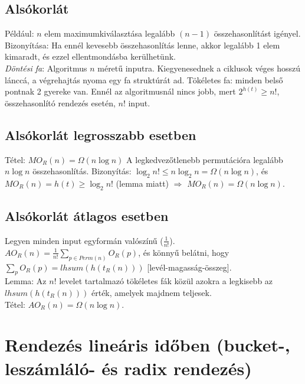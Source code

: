 \documentclass[margin=0px]{article}
\begin{document}
\subsection{Alsókorlát}

Például: $n$ elem maximumkiválasztása legalább $(n-1)$ összehasonlítást igényel. Bizonyítása: Ha ennél kevesebb összehasonlítás lenne, akkor legalább 1 elem kimaradt, és ezzel ellentmondásba kerülhetünk. \\
\textit{Döntési fa}: Algoritmus $n$ méretű inputra. Kiegyenesednek a ciklusok véges hosszú lánccá, a végrehajtás nyoma egy fa struktúrát ad. Tökéletes fa: minden belső pontnak 2 gyereke van. Ennél az algoritmusnál nincs jobb, mert $2^{h(t)} \geq n!$, összehasonlító rendezés esetén, $n!$ input.

\subsection{Alsókorlát legrosszabb esetben}

Tétel: $MO_R(n) = \Omega(n\log{n})$ A legkedvezőtlenebb permutációra legalább $n\log{n}$ összehasonlítás. Bizonyítás: $\log_2{n!} \leq n\log_2{n} = \Omega(n\log{n})$, és $MO_R(n)=h(t) \geq \log_2{n!}$ (lemma miatt) $\Rightarrow$ $MO_R(n)=\Omega(n\log{n})$.

\subsection{Alsókorlát átlagos esetben}

Legyen minden input egyformán valószínű ($\frac{1}{n!}$). \\
$AO_R(n) = \frac{1}{n!}\sum_{p \in Perm(n)}{O_R(p)}$, és könnyű belátni, hogy $\sum_{p}{O_R(p)} = lhsum(h(t_R(n)))$ [levél-magasság-összeg]. \\
Lemma: Az $n!$ levelet tartalmazó tökéletes fák közül azokra a legkisebb az $lhsum(h(t_R(n)))$ érték, amelyek majdnem teljesek. \\
Tétel: $AO_R(n) = \Omega(n\log{n})$.

\section{Rendezés lineáris időben (bucket-, leszámláló- és radix rendezés)}
\end{document}
